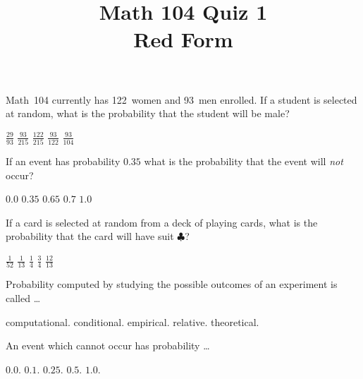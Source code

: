\documentclass[12pt]{exam}
\title{Math 104 Quiz 1\\Red Form}
\begin{document}
\maketitle
\begin{center}
\end{center}

\begin{questions}
\question Math~104 currently has 122~women and 93~men enrolled.
If a student is selected at random, what is the probability
that the student will be male?\\
\begin{oneparchoices}
\choice $\frac{29}{93}$
\choice $\frac{93}{215}$
\choice $\frac{122}{215}$
\choice $\frac{93}{122}$
\choice $\frac{93}{104}$
\end{oneparchoices}

\question If an event has probability $0.35$
what is the probability that the event will {\em not} occur?\\
\begin{oneparchoices}
\choice $0.0$
\choice $0.35$
\choice $0.65$
\choice $0.7$
\choice $1.0$
\end{oneparchoices}

\question If a card is selected at random from a deck of
playing cards, what is the probability that
the card will have suit $\clubsuit$?\\
\begin{oneparchoices}
\choice $\frac{1}{52}$
\choice $\frac{1}{13}$
\choice $\frac{1}{4}$
\choice $\frac{3}{4}$
\choice $\frac{12}{13}$
\end{oneparchoices}

\question Probability computed by studying
the possible outcomes of an experiment is called \dots\\
\begin{oneparchoices}
\choice computational.
\choice conditional.
\choice empirical.
\choice relative.
\choice theoretical.
\end{oneparchoices}

\question An event which cannot occur has probability \dots\\
\begin{oneparchoices}
\choice $0.0$.
\choice $0.1$.
\choice $0.25$.
\choice $0.5$.
\choice $1.0$.
\end{oneparchoices}


\end{questions}
\end{document}

